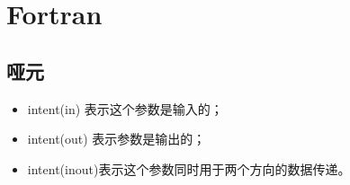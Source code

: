 \chapter{Fortran}

\section{哑元}
\begin{itemize}
\item intent(in) 表示这个参数是输入的；
\item intent(out) 表示参数是输出的；
\item intent(inout)表示这个参数同时用于两个方向的数据传递。
\end{itemize}

